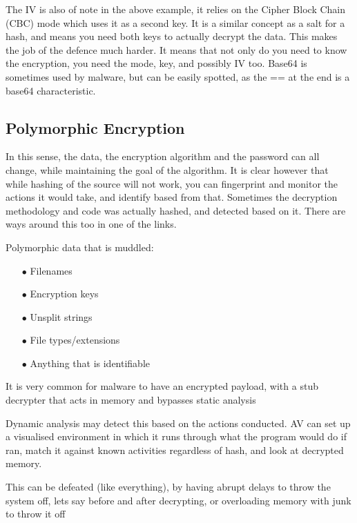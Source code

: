 
The IV is also of note in the above example, it relies on the Cipher Block Chain (CBC) mode which uses it as a second key. It is a similar concept as a salt for a hash, and means you need both keys to actually decrypt the data.
This makes the job of the defence much harder. It means that not only do you need to know the encryption, you need the mode, key, and possibly IV too. Base64 is sometimes used by malware, but can be easily spotted, as the ==
 at the end is a base64 characteristic.

\subsection{Polymorphic Encryption}
In this sense, the data, the encryption algorithm and the password can all change, while maintaining the goal of the algorithm.
It is clear however that while hashing of the source will not work, you can fingerprint and monitor the actions it would take, and identify based from that.
Sometimes the decryption methodology and code was actually hashed, and detected based on it. There are ways around this too in one of the links.

Polymorphic data that is muddled:
\begin{enumerate}
    \item [$\bullet$]Filenames
    \item [$\bullet$]Encryption keys
    \item [$\bullet$]Unsplit strings
    \item [$\bullet$]File types/extensions
    \item [$\bullet$]Anything that is identifiable
\end{enumerate}

It is very common for malware to have an encrypted payload, with a stub decrypter that acts in memory and bypasses static analysis

Dynamic analysis may detect this based on the actions conducted. AV can set up a visualised environment in which it runs through what the program would do if ran, match it against 
known activities regardless of hash, and look at decrypted memory.

This can be defeated (like everything), by having abrupt delays to throw the system off, lets say before and after decrypting, or overloading memory with junk to throw it off


